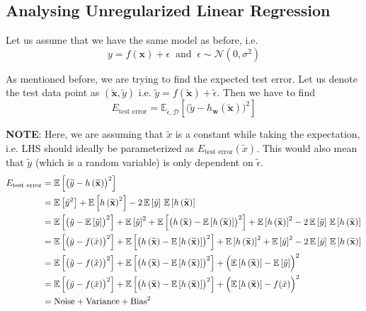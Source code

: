 \documentclass{report}
\newcommand{\w}{\mathbf{w}} %
\newcommand{\x}{\mathbf{x}}
\newcommand{\D}{\mathcal{D}}
\newcommand{\hxt}{h\left(\widetilde{\x}\right)}
\newcommand{\xt}{\tilde{x}}
\newcommand{\yt}{\tilde{y}}
\newcommand{\expe}[1]{\mathbb{E}\left[#1\right]}
\begin{document}
\subsection{Analysing Unregularized Linear Regression}

Let us assume that we have the same model as before, i.e.
$$
  y = f(\x) + \epsilon \;\;\text{and}\;\; \epsilon \sim \mathcal{N}(0,\sigma^2)
$$

As mentioned before, we are trying to find the expected test error. Let us denote the test data point as $(\widetilde{\x},\widetilde{y})$ i.e. $\widetilde{y} = f(\widetilde{\x}) + \widetilde{\epsilon}$. Then we have to find
$$
  E_{\text{test error}} = \mathbb{E}_{\widetilde{\epsilon},\D}\left[\bigl(\widetilde{y} -h_\w\left(\widetilde{\x}\right)\bigr)^2\right]
$$

\textbf{NOTE}: Here, we are assuming that $\xt$ is a constant while taking the expectation, i.e. LHS should ideally be parameterized as $E_\text{test error}(\xt)$. This would also mean that $\yt$ (which is a random variable) is only dependent on $\widetilde{\epsilon}$.
\begin{align*}
  E_{\text{test error}} & = \mathbb{E}\left[\bigl(\widetilde{y} -h\left(\widetilde{\x}\right)\bigr)^2\right]                                                                \\
                        & = \expe{\yt^2} + \expe{\hxt^2} - 2 \, \expe{\yt} \, \expe{\hxt}                                                                                   \\
                        & = \expe{\bigl(\yt - \expe{\yt}\bigr)^2} + \expe{\yt}^2 + \expe{\bigl(\hxt - \expe{\hxt}\bigr)^2} + \expe{\hxt}^2 - 2 \, \expe{\yt} \, \expe{\hxt} \\
                        & = \expe{\bigl(\yt - f(\xt)\bigr)^2} + \expe{\bigl(\hxt - \expe{\hxt}\bigr)^2} + \expe{\hxt}^2  + \expe{\yt}^2 - 2 \, \expe{\yt} \, \expe{\hxt}    \\
                        & = \expe{\bigl(\yt - f(\xt)\bigr)^2} + \expe{\bigl(\hxt - \expe{\hxt}\bigr)^2} + \Bigl(\expe{\hxt}  - \expe{\yt}\Bigr)^2                           \\
                        & = \expe{\bigl(\yt - f(\xt)\bigr)^2} + \expe{\bigl(\hxt - \expe{\hxt}\bigr)^2} + \Bigl(\expe{\hxt}  - f(\xt)\Bigr)^2                               \\
                        & = \text{Noise} + \text{Variance} + \text{Bias}^2
\end{align*}
\end{document}
